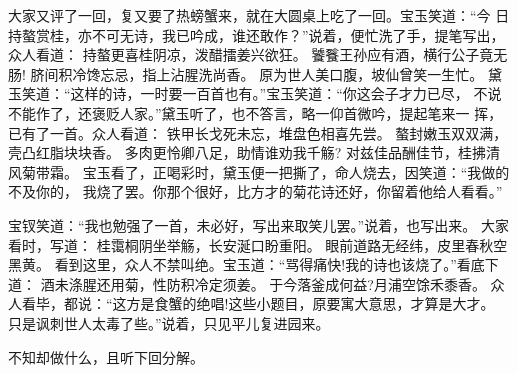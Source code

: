 大家又评了一回，复又要了热螃蟹来，就在大圆桌上吃了一回。宝玉笑道：“今
日持螯赏桂，亦不可无诗，我已吟成，谁还敢作？”说着，便忙洗了手，提笔写出，
众人看道：
持螯更喜桂阴凉，泼醋擂姜兴欲狂。
饕餮王孙应有酒，横行公子竟无肠!
脐间积冷馋忘忌，指上沾腥洗尚香。
原为世人美口腹，坡仙曾笑一生忙。
黛玉笑道：“这样的诗，一时要一百首也有。”宝玉笑道：“你这会子才力已尽，
不说不能作了，还褒贬人家。”黛玉听了，也不答言，略一仰首微吟，提起笔来一
挥，已有了一首。众人看道：
铁甲长戈死未忘，堆盘色相喜先尝。
螯封嫩玉双双满，壳凸红脂块块香。
多肉更怜卿八足，助情谁劝我千觞?
对兹佳品酬佳节，桂拂清风菊带霜。
宝玉看了，正喝彩时，黛玉便一把撕了，命人烧去，因笑道：“我做的不及你的，
我烧了罢。你那个很好，比方才的菊花诗还好，你留着他给人看看。”

宝钗笑道：“我也勉强了一首，未必好，写出来取笑儿罢。”说着，也写出来。
大家看时，写道：
桂霭桐阴坐举觞，长安涎口盼重阳。
眼前道路无经纬，皮里春秋空黑黄。
看到这里，众人不禁叫绝。宝玉道：“骂得痛快!我的诗也该烧了。”看底下道：
酒未涤腥还用菊，性防积冷定须姜。
于今落釜成何益?月浦空馀禾黍香。
众人看毕，都说：“这方是食蟹的绝唱!这些小题目，原要寓大意思，才算是大才。
只是讽刺世人太毒了些。”说着，只见平儿复进园来。

不知却做什么，且听下回分解。